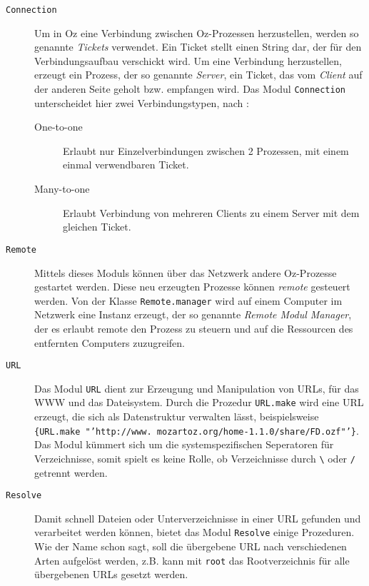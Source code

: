 \begin{description}
  \item[\texttt{Connection}] Um in Oz eine Verbindung zwischen Oz-Prozessen
  herzustellen, werden so genannte \textsl{Tickets}
  \cite[System Modules, Part III]{url:mozart-documentation} verwendet. Ein
  Ticket stellt einen String
  dar, der für den Verbindungsaufbau verschickt wird. Um eine Verbindung
  herzustellen, erzeugt ein Prozess, der so genannte \textsl{Server}, ein Ticket,
  das vom \textsl{Client} auf der anderen Seite geholt bzw. empfangen wird.
  Das Modul \texttt{Connection} unterscheidet hier zwei Verbindungstypen,
  nach \cite[System Modules, Part III]{url:mozart-documentation}:
  \begin{description}
    \item[One-to-one] Erlaubt nur Einzelverbindungen zwischen 2 Prozessen, mit
    einem einmal verwendbaren Ticket.
    \item[Many-to-one] Erlaubt Verbindung von mehreren Clients zu einem Server
    mit dem gleichen Ticket.
  \end{description}
  \item[\texttt{Remote}] Mittels dieses Moduls können über das Netzwerk andere
  Oz-Prozesse gestartet werden. Diese neu erzeugten Prozesse können
  \textsl{remote} gesteuert werden. Von der Klasse \texttt{Remote.manager} wird
  auf einem Computer im Netzwerk eine Instanz erzeugt, der so genannte
  \textsl{Remote Modul Manager}, der es erlaubt remote den Prozess zu steuern
  und auf die Ressourcen des entfernten Computers zuzugreifen. 
  \item[\texttt{URL}] Das Modul \texttt{URL} dient zur Erzeugung und Manipulation
  von URLs, für das WWW und das Dateisystem. Durch die Prozedur \texttt{URL.make}
  wird eine URL erzeugt, die sich als Datenstruktur verwalten lässt,
  beispielsweise \texttt{\{URL.make 
  "'http://www. mozart\-oz.org/home-1.1.0/share/FD.ozf"'\}}. Das Modul kümmert
  sich um die systemspezifischen Seperatoren für Verzeichnisse, somit spielt es
  keine Rolle, ob Verzeichnisse durch \verb+\+ oder \verb+/+ getrennt werden.
  
  \item[\texttt{Resolve}] Damit schnell Dateien oder Unterverzeichnisse in
  einer URL gefunden und verarbeitet werden können, bietet das Modul
  \texttt{Resolve} einige Prozeduren. Wie der Name schon sagt, soll die
  übergebene URL nach verschiedenen Arten aufgelöst werden, z.B. kann mit
  \texttt{root} das Rootverzeichnis für alle übergebenen URLs gesetzt werden.
  

\end{description}
